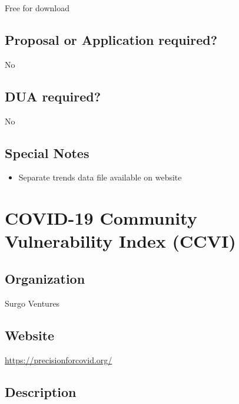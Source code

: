 \documentclass[
]{book}
\providecommand{\tightlist}{%
  \setlength{\itemsep}{0pt}\setlength{\parskip}{0pt}}
\begin{document}
Free for download

\hypertarget{proposal-or-application-required-20}{%
\section{Proposal or Application required?}\label{proposal-or-application-required-20}}

No

\hypertarget{dua-required-20}{%
\section{DUA required?}\label{dua-required-20}}

No

\hypertarget{special-notes-20}{%
\section{Special Notes}\label{special-notes-20}}

\begin{itemize}
\tightlist
\item
  Separate trends data file available on website
\end{itemize}

\mainmatter

\hypertarget{covid-19-community-vulnerability-index-ccvi}{%
\chapter{COVID-19 Community Vulnerability Index (CCVI)}\label{covid-19-community-vulnerability-index-ccvi}}

\hypertarget{organization-21}{%
\section{Organization}\label{organization-21}}

Surgo Ventures

\hypertarget{website-21}{%
\section{Website}\label{website-21}}

\url{https://precisionforcovid.org/}

\hypertarget{description-21}{%
\section{Description}\label{description-21}}
\end{document}
